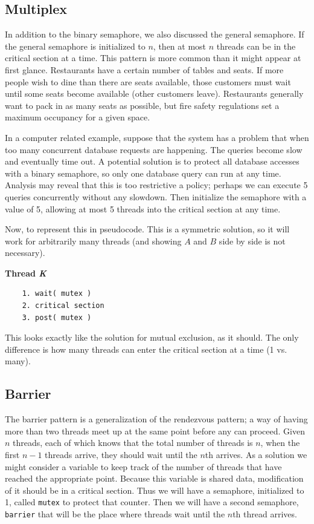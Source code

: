 \subsection*{Multiplex}
In addition to the binary semaphore, we also discussed the general semaphore. If the general semaphore is initialized to $n$, then at most $n$ threads can be in the critical section at a time. This pattern is more common than it might appear at first glance. Restaurants have a certain number of tables and seats. If more people wish to dine than there are seats available, those customers must wait until some seats become available (other customers leave). Restaurants generally want to pack in as many seats as possible, but fire safety regulations set a maximum occupancy for a given space.

In a computer related example, suppose that the system has a problem that when too many concurrent database requests are happening. The queries become slow and eventually time out. A potential solution is to protect all database accesses with a binary semaphore, so only one database query can run at any time. Analysis may reveal that this is too restrictive a policy; perhaps we can execute 5 queries concurrently without any slowdown. Then initialize the semaphore with a value of 5, allowing at most 5 threads into the critical section at any time.

Now, to represent this in pseudocode. This is a symmetric solution, so it will work for arbitrarily many threads (and showing $A$ and $B$ side by side is not necessary).

\textbf{Thread \textit{K}}\vspace{-2em}
  \begin{verbatim}
	1. wait( mutex )
	2. critical section
	3. post( mutex )
  \end{verbatim}
\vspace{-2em}

This looks exactly like the solution for mutual exclusion, as it should. The only difference is how many threads can enter the critical section at a time (1 vs. many). 


\subsection*{Barrier}
The barrier pattern is a generalization of the rendezvous pattern; a way of having more than two threads meet up at the same point before any can proceed. Given $n$ threads, each of which knows that the total number of threads is $n$, when the first $n-1$ threads arrive, they should wait until the $n$th arrives. As a solution we might consider a variable to keep track of the number of threads that have reached the appropriate point. Because this variable is shared data, modification of it should be in a critical section.  Thus we will have a semaphore, initialized to 1, called \texttt{mutex} to protect that counter. Then we will have a second semaphore, \texttt{barrier} that will be the place where threads wait until the $n$th thread arrives.


